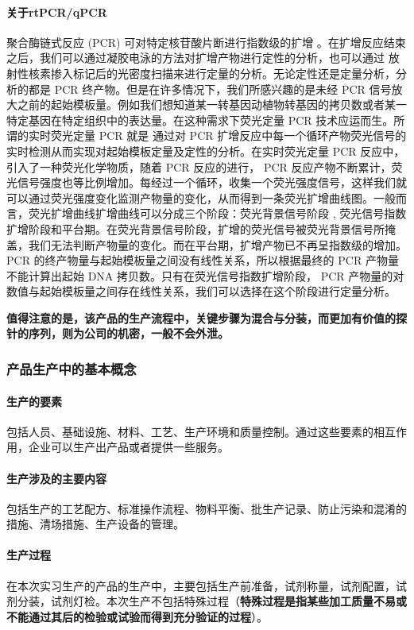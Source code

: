 \paragraph{关于rtPCR/qPCR} 聚合酶链式反应 (PCR) 可对特定核苷酸片断进行指数级的扩增 。在扩增反应结束之后，我们可以通过凝胶电泳的方法对扩增产物进行定性的分析，也可以通过 放射性核素掺入标记后的光密度扫描来进行定量的分析。无论定性还是定量分析，分析的都是 PCR 终产物。但是在许多情况下，我们所感兴趣的是未经 PCR 信号放大之前的起始模板量。例如我们想知道某一转基因动植物转基因的拷贝数或者某一特定基因在特定组织中的表达量。在这种需求下荧光定量 PCR 技术应运而生。所谓的实时荧光定量 PCR 就是 通过对 PCR 扩增反应中每一个循环产物荧光信号的实时检测从而实现对起始模板定量及定性的分析。在实时荧光定量 PCR 反应中，引入了一种荧光化学物质，随着 PCR 反应的进行， PCR 反应产物不断累计，荧光信号强度也等比例增加。每经过一个循环，收集一个荧光强度信号，这样我们就可以通过荧光强度变化监测产物量的变化，从而得到一条荧光扩增曲线图。一般而言，荧光扩增曲线扩增曲线可以分成三个阶段：荧光背景信号阶段 , 荧光信号指数扩增阶段和平台期。在荧光背景信号阶段，扩增的荧光信号被荧光背景信号所掩盖，我们无法判断产物量的变化。而在平台期，扩增产物已不再呈指数级的增加。 PCR 的终产物量与起始模板量之间没有线性关系，所以根据最终的 PCR 产物量不能计算出起始 DNA 拷贝数。只有在荧光信号指数扩增阶段， PCR 产物量的对数值与起始模板量之间存在线性关系，我们可以选择在这个阶段进行定量分析。

\textbf{值得注意的是，该产品的生产流程中，关键步骤为混合与分装，而更加有价值的探针的序列，则为公司的机密，一般不会外泄。}

\subsubsection{产品生产中的基本概念}

\paragraph{生产的要素} 包括人员、基础设施、材料、工艺、生产环境和质量控制。通过这些要素的相互作用，企业可以生产出产品或者提供一些服务。

\paragraph{生产涉及的主要内容} 包括生产的工艺配方、标准操作流程、物料平衡、批生产记录、防止污染和混淆的措施、清场措施、生产设备的管理。

\paragraph{生产过程} 在本次实习生产的产品的生产中，主要包括生产前准备，试剂称量，试剂配置，试剂分装，试剂灯检。本次生产不包括特殊过程（\textbf{特殊过程是指某些加工质量不易或不能通过其后的检验或试验而得到充分验证的过程}）。

